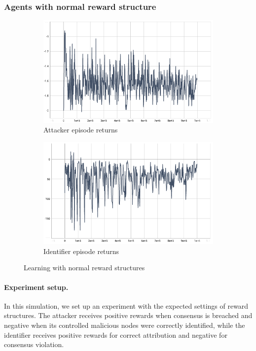 \documentclass[a4paper,11pt]{article}
\begin{document}
\subsubsection{Agents with normal reward structure}
\begin{figure}[h!]
  \centering
  \begin{subfigure}[b]{0.49\linewidth}
    \includegraphics[width=\linewidth]{graphs/test_attacker_agent_return_mean_notindependent.PNG}
    \caption{Attacker episode returns}
  \end{subfigure}
  \begin{subfigure}[b]{0.49\linewidth}
    \includegraphics[width=\linewidth]{graphs/test_identifier_agent_return_mean_notindependent.PNG}
    \caption{Identifier episode returns}
  \end{subfigure}
  \caption{Learning with normal reward structures}
  \label{fig:coffee}
\end{figure}
\paragraph{Experiment setup.}
In this simulation, we set up an experiment with the expected settings of reward structures. The attacker receives positive rewards when consensus is breached and negative when its controlled malicious nodes were correctly identified, while the identifier receives positive rewards for correct attribution and negative for consensus violation.  
\end{document}
